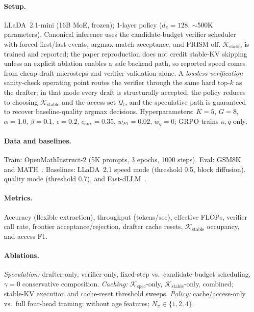 \documentclass[11pt]{article}
\newcommand{\cK}{\mathcal{K}}
\newcommand{\cQ}{\mathcal{Q}}
\begin{document}
\paragraph{Setup.}  LLaDA~2.1-mini (16B MoE, frozen); 1-layer policy ($d_\pi{=}128$, ${\sim}$500K parameters).
Canonical inference uses the candidate-budget verifier scheduler with forced first/last events, argmax-match acceptance, and PRISM off.
$\cK_{\text{stable}}$ is trained and reported; the paper reproduction does not credit stable-KV skipping unless an explicit ablation enables a safe backend path, so reported speed comes from cheap draft microsteps and verifier validation alone.
A \emph{lossless-verification} sanity-check operating point routes the verifier through the same hard top-$k$ as the drafter; in that mode every draft is structurally accepted, the policy reduces to choosing $\cK_{\text{stable}}$ and the access set $\cQ_t$, and the speculative path is guaranteed to recover baseline-quality argmax decisions.
Hyperparameters: $K{=}5$, $G{=}8$, $\alpha{=}1.0$, $\beta{=}0.1$, $\epsilon{=}0.2$, $c_{\text{aux}}{=}0.35$, $w_{F1}{=}0.02$, $w_q{=}0$; GRPO trains $\kappa, q$ only.

\paragraph{Data and baselines.}  Train: OpenMathInstruct-2 (5K prompts, 3 epochs, 1000 steps).  Eval: GSM8K~\cite{cobbe2021gsm8k} and MATH~\cite{hendrycks2021math}.  Baselines: LLaDA~2.1 speed mode (threshold 0.5, block diffusion), quality mode (threshold 0.7), and Fast-dLLM~\cite{wu2025fastdllm}.

\paragraph{Metrics.}  Accuracy (flexible extraction), throughput (tokens/sec), effective FLOPs, verifier call rate, frontier acceptance/rejection, drafter cache resets, $\cK_{\text{stable}}$ occupancy, and access F1.

\paragraph{Ablations.}
\emph{Speculation:} drafter-only, verifier-only, fixed-step vs.\ candidate-budget scheduling, $\gamma{=}0$ conservative composition.
\emph{Caching:} $\cK_{\text{spec}}$-only, $\cK_{\text{stable}}$-only, combined; stable-KV execution and cache-reset threshold sweeps.
\emph{Policy:} cache/access-only vs.\ full four-head training; without age features; $N_\pi \in \{1,2,4\}$.
\end{document}
